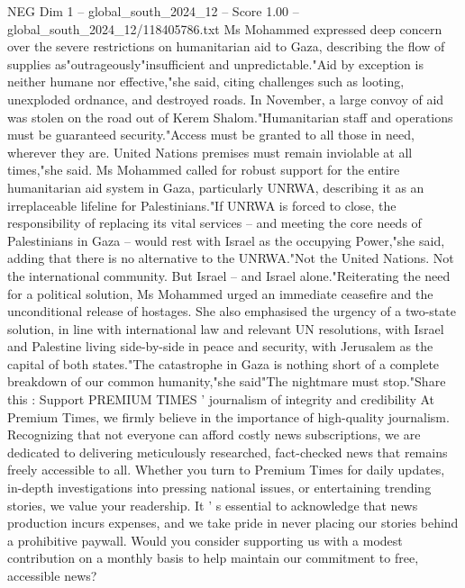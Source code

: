 \begin{textsample}{NEG Dim 1 – global\_south\_2024\_12 – Score 1.00 – global\_south\_2024\_12/118405786.txt}
Ms Mohammed expressed deep concern over the severe restrictions on humanitarian aid to Gaza, describing the flow of supplies as"outrageously"insufficient and unpredictable."Aid by exception is neither humane nor effective,"she said, citing challenges such as looting, unexploded ordnance, and destroyed roads.
In November, a large convoy of aid was stolen on the road out of Kerem Shalom."Humanitarian staff and operations must be guaranteed security."Access must be granted to all those in need, wherever they are.
United Nations premises must remain inviolable at all times,"she said.
Ms Mohammed called for robust support for the entire humanitarian aid system in Gaza, particularly UNRWA, describing it as an irreplaceable lifeline for Palestinians."If UNRWA is forced to close, the responsibility of replacing its vital services -- and meeting the core needs of Palestinians in Gaza -- would rest with Israel as the occupying Power,"she said, adding that there is no alternative to the UNRWA."Not the United Nations.
Not the international community.
But Israel -- and Israel alone."Reiterating the need for a political solution, Ms Mohammed urged an immediate ceasefire and the unconditional release of hostages.
She also emphasised the urgency of a two-state solution, in line with international law and relevant UN resolutions, with Israel and Palestine living side-by-side in peace and security, with Jerusalem as the capital of both states."The catastrophe in Gaza is nothing short of a complete breakdown of our common humanity,"she said"The nightmare must stop."Share this : Support PREMIUM TIMES ' journalism of integrity and credibility At Premium Times, we firmly believe in the importance of high-quality journalism.
Recognizing that not everyone can afford costly news subscriptions, we are dedicated to delivering meticulously researched, fact-checked news that remains freely accessible to all.
Whether you turn to Premium Times for daily updates, in-depth investigations into pressing national issues, or entertaining trending stories, we value your readership.
It ' s essential to acknowledge that news production incurs expenses, and we take pride in never placing our stories behind a prohibitive paywall.
Would you consider supporting us with a modest contribution on a monthly basis to help maintain our commitment to free, accessible news?

\end{textsample}
